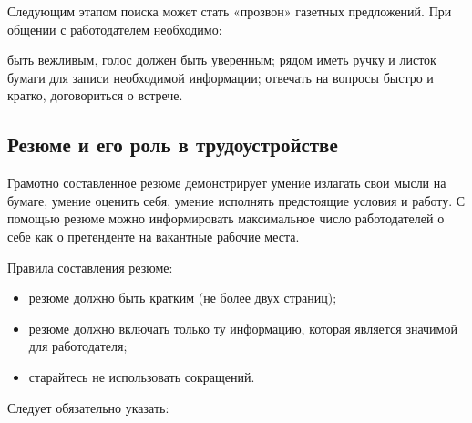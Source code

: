 Следующим этапом поиска может стать «прозвон» газетных предложений. При общении с работодателем необходимо:

быть вежливым, голос должен быть уверенным;
рядом иметь ручку и листок бумаги для записи необходимой информации;
отвечать на вопросы быстро и кратко, договориться о встрече.

\subsection{Резюме и его роль в трудоустройстве}
Грамотно составленное резюме демонстрирует умение излагать свои мысли на бумаге, умение оценить себя, умение исполнять предстоящие условия и работу. С помощью резюме можно информировать максимальное число работодателей о себе как о претенденте на вакантные рабочие места.

Правила составления резюме:

\begin{itemize}[noitemsep, label=--]
    \item резюме должно быть кратким (не более двух страниц);
    \item резюме должно включать только ту информацию, которая является значимой для работодателя;
    \item старайтесь не использовать сокращений.
\end{itemize}

Следует обязательно указать:

